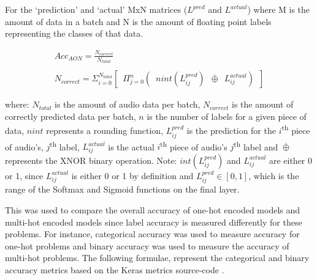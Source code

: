 \documentclass[12pt]{article}
\begin{document}
	For the `prediction' and `actual' MxN matrices ($L^{pred}$ and $L^{actual}$) where M is the amount of data in a batch and N is the amount of floating point labels representing the classes of that data.
    
    \begin{gather*}
    	Acc_{AON} = \frac{N_{correct}}{N_{total}}\\\\
    	N_{correct} = \Sigma_{i=0}^{N_{total}}\left[\enspace\Pi_{j=0}^{n}\left(\enspace nint(L_{ij}^{pred})\enspace\overline{\oplus}\enspace L_{ij}^{actual}\right)\enspace\right]
	\end{gather*}
	
	\begin{footnotesize}
	    where: $N_{total}$ is the amount of audio data per batch, $N_{correct}$ is the amount of correctly predicted data per batch, $n$ is the number of labels for a given piece of data, $nint$ represents a rounding function, $L_{ij}^{pred}$ is the prediction for the $i$\textsuperscript{th} piece of audio's, $j$\textsuperscript{th} label, $L_{ij}^{actual}$ is the actual $i$\textsuperscript{th} piece of audio's  $j$\textsuperscript{th} label and $\overline{\oplus}$ represents the XNOR binary operation. Note: $int(L_{ij}^{pred})$ and $L_{ij}^{actual}$ are either 0 or 1, since $L_{ij}^{actual}$ is either 0 or 1 by definition and $L_{ij}^{pred} \in [0, 1]$, which is the range of the Softmax and Sigmoid functions on the final layer.
	\end{footnotesize}\bigskip
	
	This was used to compare the overall accuracy of one-hot encoded models and multi-hot encoded models since label accuracy is measured differently for these problems. For instance, categorical accuracy was used to measure accuracy for one-hot problems and binary accuracy was used to measure the accuracy of multi-hot problems. The following formulae, represent the categorical and binary accuracy metrics based on the Keras metrics source-code \parencite{Keras}.
	
\end{document}
